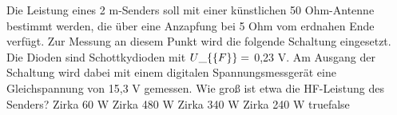     {Die Leistung eines 2 m-Senders soll mit einer künstlichen 50 Ohm-Antenne bestimmt werden, die über eine Anzapfung bei 5 Ohm vom erdnahen Ende verfügt. Zur Messung an diesem Punkt wird die folgende Schaltung eingesetzt. Die Dioden sind Schottkydioden mit $U\_\{\textrm\{F\}\} =$ 0,23 V. Am Ausgang der Schaltung wird dabei mit einem digitalen Spannungsmessgerät eine Gleichspannung von 15,3 V gemessen. Wie groß ist etwa die HF-Leistung des Senders?}
    {Zirka 60 W}
    {Zirka 480 W}
    {Zirka 340 W}
    {Zirka 240 W}
    {true}{false}